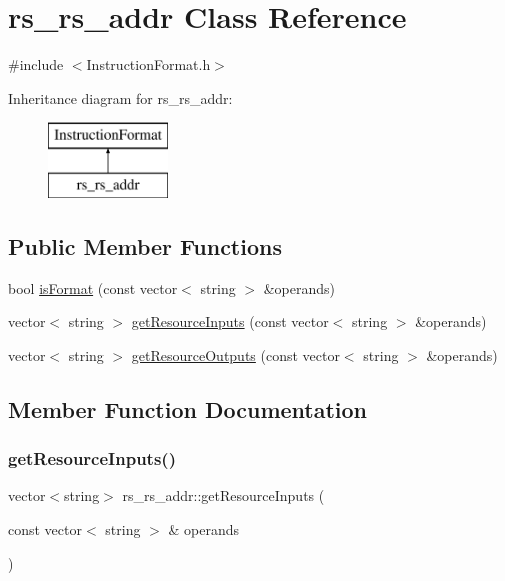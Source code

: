 \hypertarget{classrs__rs__addr}{}\section{rs\+\_\+rs\+\_\+addr Class Reference}
\label{classrs__rs__addr}


{\ttfamily \#include $<$Instruction\+Format.\+h$>$}

Inheritance diagram for rs\+\_\+rs\+\_\+addr\+:\begin{figure}[H]
\begin{center}
\leavevmode
\includegraphics[height=2.000000cm]{classrs__rs__addr}
\end{center}
\end{figure}
\subsection*{Public Member Functions}
\begin{DoxyCompactItemize}
\item 
bool \hyperlink{classrs__rs__addr_a8e43a85fbdd3849d11088baa3db70185}{is\+Format} (const vector$<$ string $>$ \&operands)
\item 
vector$<$ string $>$ \hyperlink{classrs__rs__addr_a48fbea2fd176094ecbcfac62627a5cd7}{get\+Resource\+Inputs} (const vector$<$ string $>$ \&operands)
\item 
vector$<$ string $>$ \hyperlink{classrs__rs__addr_a6918ea18f88f75f349bd59c397bb5ca1}{get\+Resource\+Outputs} (const vector$<$ string $>$ \&operands)
\end{DoxyCompactItemize}


\subsection{Member Function Documentation}
\mbox{\label{classrs__rs__addr_a48fbea2fd176094ecbcfac62627a5cd7}} 
\subsubsection{\texorpdfstring{get\+Resource\+Inputs()}{getResourceInputs()}}
{\footnotesize\ttfamily vector$<$string$>$ rs\+\_\+rs\+\_\+addr\+::get\+Resource\+Inputs (\begin{DoxyParamCaption}\item[{const vector$<$ string $>$ \&}]{operands }\end{DoxyParamCaption})\hspace{0.3cm}{\ttfamily [virtual]}}

